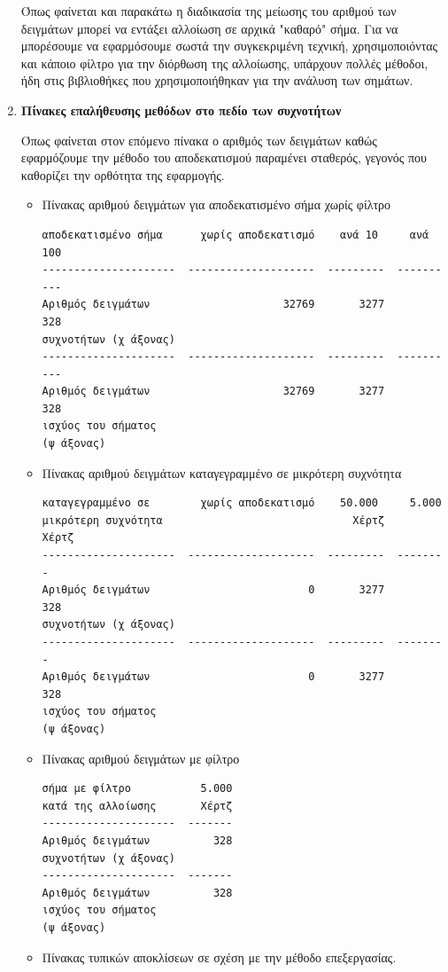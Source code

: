 \documentclass[breaklines=true, 12pt]{article}
\begin{document}
\begin{enumerate}
Όπως φαίνεται και παρακάτω η διαδικασία της μείωσης του αριθμού των
δειγμάτων μπορεί να εντάξει αλλοίωση σε αρχικά "καθαρό" σήμα. Για να
μπορέσουμε να εφαρμόσουμε σωστά την συγκεκριμένη τεχνική, χρησιμοποιόντας
και κάποιο φίλτρο για την διόρθωση της αλλοίωσης, υπάρχουν πολλές μέθοδοι,
ήδη στις βιβλιοθήκες που χρησιμοποιήθηκαν για την ανάλυση των σημάτων.
\clearpage
\item \textbf{Πίνακες επαλήθευσης μεθόδων στο πεδίο των συχνοτήτων}
\label{sec:org88cc512}

Όπως φαίνεται στον επόμενο πίνακα ο αριθμός των δειγμάτων καθώς
εφαρμόζουμε την μέθοδο του αποδεκατισμού παραμένει σταθερός, γεγονός που
καθορίζει την ορθότητα της εφαρμογής.
\begin{itemize}
\item Πίνακας αριθμού δειγμάτων για αποδεκατισμένο σήμα χωρίς φίλτρο
\begin{verbatim}
αποδεκατισμένο σήμα      χωρίς αποδεκατισμό    ανά 10     ανά 100
---------------------  --------------------  ---------  ----------
Αριθμός δειγμάτων                     32769       3277         328
συχνοτήτων (χ άξονας)
---------------------  --------------------  ---------  ----------
Αριθμός δειγμάτων                     32769       3277         328
ισχύος του σήματος
(ψ άξονας)
\end{verbatim}
\item Πίνακας αριθμού δειγμάτων καταγεγραμμένο σε μικρότερη συχνότητα
\begin{verbatim}
καταγεγραμμένο σε        χωρίς αποδεκατισμό    50.000     5.000
μικρότερη συχνότητα                              Χέρτζ     Χέρτζ
---------------------  --------------------  ---------  --------
Αριθμός δειγμάτων                         0       3277       328
συχνοτήτων (χ άξονας)
---------------------  --------------------  ---------  --------
Αριθμός δειγμάτων                         0       3277       328
ισχύος του σήματος
(ψ άξονας)
\end{verbatim}
\item Πίνακας αριθμού δειγμάτων με φίλτρο
\begin{verbatim}
σήμα με φίλτρο           5.000
κατά της αλλοίωσης       Χέρτζ
---------------------  -------
Αριθμός δειγμάτων          328
συχνοτήτων (χ άξονας)
---------------------  -------
Αριθμός δειγμάτων          328
ισχύος του σήματος
(ψ άξονας)
\end{verbatim}
\item Πίνακας τυπικών αποκλίσεων σε σχέση με την μέθοδο επεξεργασίας.
\begin{itemize}

\end{itemize}
\end{itemize}
\end{enumerate}
\end{document}
